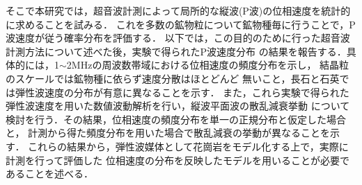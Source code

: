 そこで本研究では，超音波計測によって局所的な縦波(P波)の位相速度を統計的に求めることを試みる．
これを多数の鉱物粒について鉱物種毎に行うことで，P波速度が従う確率分布を評価する．
以下では，この目的のために行った超音波計測方法について述べた後，実験で得られたP波速度分布
の結果を報告する．具体的には，1$\sim$2MHzの周波数帯域における位相速度の頻度分布を示し，
結晶粒のスケールでは鉱物種に依らず速度分散はほとどんど
無いこと，長石と石英では弾性波速度の分布が有意に異なることを示す．
また，これら実験で得られた弾性波速度を用いた数値波動解析を行い，縦波平面波の散乱減衰挙動
について検討を行う．その結果，位相速度の頻度分布を単一の正規分布と仮定した場合と，
計測から得た頻度分布を用いた場合で散乱減衰の挙動が異なることを示す．
これらの結果から，弾性波媒体として花崗岩をモデル化する上で，実際に計測を行って評価した
位相速度の分布を反映したモデルを用いることが必要であることを述べる．

